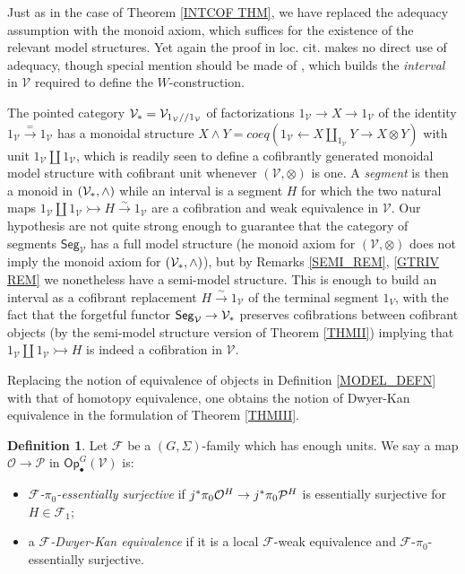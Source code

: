 \documentclass[a4paper,10pt
,draft
]{article}%
\numberwithin{equation}{section}
\numberwithin{figure}{section}
\theoremstyle{definition} %
\newtheorem{definition}[equation]{Definition}%
\newcommand{\Op}{\mathsf{Op}}%
\newcommand{\F}{\ensuremath{\mathcal F}}
\newcommand{\V}{\ensuremath{\mathcal V}}
\renewcommand{\O}{\ensuremath{\mathcal O}}
\renewcommand{\P}{\ensuremath{\mathcal P}}
\newcommand{\1}{\ensuremath{\mathbbm 1}}%
\begin{document}
Just as in the case of Theorem \ref{INTCOF THM},
we have replaced the adequacy assumption \cite[Def. 1.1]{BM13}
with the monoid axiom, which suffices for the existence of the relevant model structures. 
Yet again the proof in loc. cit. makes no direct use of adequacy, 
though special mention should be made of \cite[Lemma 2.23]{BM13}, 
which builds the \emph{interval} \cite[Def. 4.1]{BM06} in $\V$
required to define the $W$-construction.

The pointed category $\V_{\**}=\V_{1_{\V}//1_{\V}}$
of factorizations
$1_{\V} \to X \to 1_{\V}$
of the identity
$1_{\V} \xrightarrow{=} 1_{\V}$
has a monoidal structure
$X \wedge Y  = coeq \left(1_{\V} \leftarrow X \amalg_{1_{\V}} Y \to X \otimes Y\right)$ with unit $1_{\V} \amalg 1_{\V}$,
which is readily seen to define a cofibrantly generated monoidal model structure with cofibrant unit whenever $(\V,\otimes)$ is one.
A \emph{segment} \cite[Def. 4.1]{BM06} is then a monoid
in $(\V_{\**},\wedge)$
while an interval is a segment $H$ for which the two natural maps
$1_{\V} \amalg 1_{\V} \rightarrowtail H \xrightarrow{\sim} 1_{\V}$
are a cofibration and weak equivalence in $\V$.
Our hypothesis are not quite strong enough 
to guarantee that the category of segments $\mathsf{Seg}_{\V}$
has a full model structure 
(he monoid axiom for $(\V,\otimes)$ does not imply the monoid axiom for $(\V_{\**},\wedge)$),
but by Remarks \ref{SEMI_REM}, \ref{GTRIV REM}
we nonetheless have a semi-model structure. This is enough to build an interval as a cofibrant replacement
$H \xrightarrow{\sim} 1_{\V}$
of the terminal segment $1_{V}$, with the fact that the forgetful functor
$\mathsf{Seg}_{\V} \to \V_{\**}$
preserves cofibrations between cofibrant objects 
(by the semi-model structure version of Theorem \ref{THMII})
implying that
$1_{\V} \amalg 1_{\V} \rightarrowtail H$
is indeed a cofibration in $\V$.


\vskip 10pt



Replacing the notion of equivalence of objects
in Definition \ref{MODEL_DEFN}
with that of homotopy equivalence, 
one obtains the notion of Dwyer-Kan equivalence
in the formulation of Theorem \ref{THMIII}.


\begin{definition}\label{DKEQUIV_DEF}
Let $\F$ be a $(G,\Sigma)$-family which has enough units.
We say a map $\O \to \P$ in $\Op^G_\bullet(\V)$ is:
\begin{itemize}
\item \textit{$\F$-$\pi_0$-essentially surjective} if
	$j^{\**}\pi_0 \O^H \to j^{\**}\pi_0 \P^H$
	is essentially surjective for $H \in \F_1$;
\item a \textit{$\F$-Dwyer-Kan equivalence} if
	it is a local $\F$-weak equivalence and $\F$-$\pi_0$-essentially
	surjective.
\end{itemize}
\end{definition}
\end{document}

